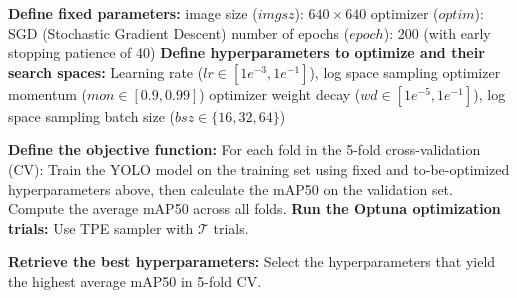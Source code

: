 \begin{algorithm}[H]
  \caption{Optuna-Based Hyperparameter Optimization for each YOLO Model} \label{alg:tune}
      \begin{algorithmic}
      \State \textbf{Define fixed parameters:}
          \Indent
              \State image size ($imgsz$): $640 \times 640$
              \State optimizer ($optim$): SGD (Stochastic Gradient Descent)
              \State number of epochs ($epoch$): 200 (with early stopping patience of 40)
          \EndIndent
      \State \textbf{Define hyperparameters to optimize and their search spaces:}
          \Indent
              \State Learning rate ($lr \in [1e^{-3}, 1e^{-1}]$), log space sampling
              \State optimizer momentum ($mon \in [0.9, 0.99]$)
              \State optimizer weight decay ($wd \in [1e^{-5}, 1e^{-1}]$), log space sampling
              \State batch size ($bsz \in \{16, 32, 64\}$)
          \EndIndent

      \State \textbf{Define the objective function:}
          \Indent
              \State For each fold in the 5-fold cross-validation (CV):
              \Indent
                  \State Train the YOLO model on the training set using fixed and to-be-optimized hyperparameters above, then calculate the mAP50 on the validation set.
              \EndIndent
              \State Compute the average mAP50 across all folds.
          \EndIndent
      \State \textbf{Run the Optuna optimization trials:}
          \Indent
              \State Use TPE sampler with $\mathcal{T}$ trials.
          \EndIndent

      \State \textbf{Retrieve the best hyperparameters:}
          \Indent
              \State Select the hyperparameters that yield the highest average mAP50 in 5-fold CV.
          \EndIndent
      \end{algorithmic}
  \end{algorithm}